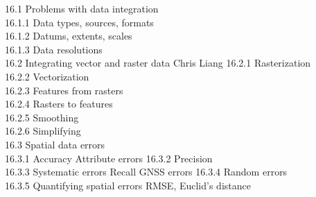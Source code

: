 \documentclass[
]{book}
\begin{document}
16.1 Problems with data integration\\
16.1.1 Data types, sources, formats\\
16.1.2 Datums, extents, scales\\
16.1.3 Data resolutions\\
16.2 Integrating vector and raster data Chris Liang
16.2.1 Rasterization\\
16.2.2 Vectorization\\
16.2.3 Features from rasters\\
16.2.4 Rasters to features\\
16.2.5 Smoothing\\
16.2.6 Simplifying\\
16.3 Spatial data errors\\
16.3.1 Accuracy Attribute errors
16.3.2 Precision\\
16.3.3 Systematic errors Recall GNSS errors
16.3.4 Random errors\\
16.3.5 Quantifying spatial errors RMSE, Euclid's distance

  
\end{document}
